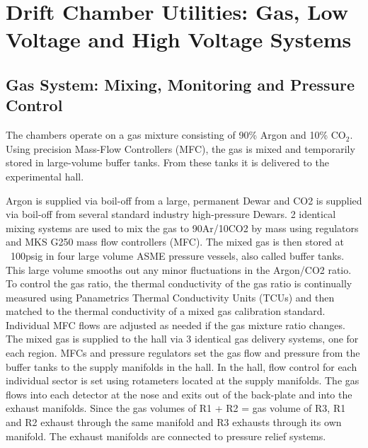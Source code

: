 \section{Drift Chamber Utilities: Gas, Low Voltage and High Voltage Systems}

\subsection{Gas System: Mixing, Monitoring and Pressure Control}

The chambers operate on a gas mixture consisting of 90\% Argon and 10\% CO$_2$.
Using precision Mass-Flow Controllers (MFC), the gas is mixed and temporarily
stored in large-volume buffer tanks.  From these tanks it is delivered
to the experimental hall.  

Argon is supplied via boil-off from a large, permanent Dewar and CO2 is supplied 
via boil-off from several standard industry high-pressure Dewars. 2 identical mixing
systems are used to mix the gas to 90Ar/10CO2 by mass using regulators and MKS G250 
mass flow controllers (MFC).  The mixed gas is then stored at ~100psig in four large 
volume ASME pressure vessels, also called buffer tanks. This large volume smooths out 
any minor fluctuations in the Argon/CO2 ratio. To control the gas ratio, the thermal 
conductivity of the gas ratio is continually measured using Panametrics Thermal 
Conductivity Units (TCUs) and then matched to the thermal conductivity of a mixed 
gas calibration standard. Individual MFC flows are adjusted as needed if the gas mixture
ratio changes. The mixed gas is supplied to the hall via 3 identical gas delivery systems, 
one for each region. MFCs and pressure regulators set the gas flow and pressure from the 
buffer tanks to the supply manifolds in the hall. In the hall, flow control for each 
individual sector is set using rotameters located at the supply manifolds. The gas flows 
into each detector at the nose and exits out of the back-plate and into the exhaust 
manifolds. Since the gas volumes of R1 + R2 = gas volume of R3, R1 and R2 exhaust 
through the same manifold and R3 exhausts through its own manifold. The exhaust manifolds 
are connected to pressure relief systems. 

